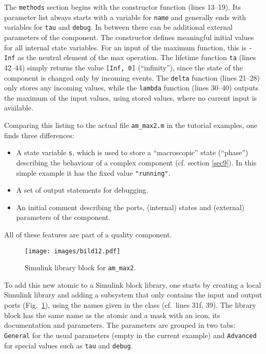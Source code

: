 \documentclass[12pt,oneside,a4paper,bibtotoc,BCOR=0pt,DIV=20]{scrreprt}
\newcommand{\cft}[1]{\mbox{\texttt{#1}}}   %
\newcommand{\defi}[1]{``#1''}
\begin{document}
The \cft{methods} section begins with the constructor function (lines
13--19). Its parameter list always starts with a variable for \cft{name} and
generally ends with variables for \cft{tau} and \cft{debug}. In between there
can be additional external parameters of the component. The constructor defines
meaningful initial values for all internal state variables. For an input of the
maximum function, this is \cft{-Inf} as the neutral element of the max
operation. The lifetime function \cft{ta} (lines 42--44) simply returns the
value \cft{[Inf, 0]} (\defi{infinity}), since the state of the component is
changed only by incoming events. The \cft{delta} function (lines 21--28) only
stores any incoming values, while the \cft{lambda} function (lines 30--40)
outputs the maximum of the input values, using stored values, where no current
input is available.

Comparing this listing to the actual file \cft{am\_max2.m} in the tutorial
examples, one finds three differences:
\begin{itemize}
\item A state variable \cft{s}, which is used to store a \defi{macroscopic}
  state (\defi{phase}) describing the behaviour of a complex component
  (cf. section \ref{sec9}). In this simple example it has the fixed value
  \cft{"running"}.
\item A set of output statements for debugging.
\item An initial comment describing the ports, (internal) states and (external)
  parameters of the component.
\end{itemize}
All of these features are part of a quality component.

\begin{figure}[ht]
\centering
\texttt{[image: images/bild12.pdf]}
\caption{Simulink library block for \cft{am\_max2}.}
\label{fig_12}
\end{figure}

To add this new atomic to a Simulink block library, one starts by creating a
local Simulink library and adding a subsystem that only contains the input and
output ports (Fig.\ \ref{fig_12}), using the names given in the class
(cf.\ lines 31f, 39). The library block has the same name as the atomic and a
mask with an icon, its documentation and parameters. The parameters are grouped
in two tabs: \cft{General} for the usual parameters (empty in the current
example) and \cft{Advanced} for special values such as \cft{tau} and
\cft{debug}.
\end{document}
